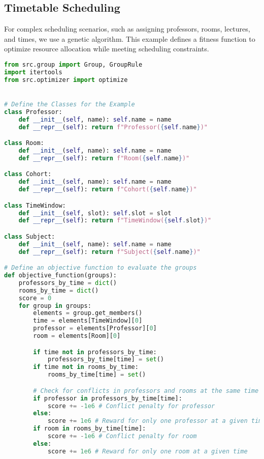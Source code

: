 \subsection{Timetable Scheduling}
For complex scheduling scenarios, such as assigning professors, rooms, lectures, and times, we use a genetic algorithm. This example defines a fitness function to optimize resource allocation while meeting scheduling constraints. 

\begin{lstlisting}[language=Python, caption={Creating and solving the Timetable Scheduling Problem using this framework.}, label={script:time_table}]
from src.group import Group, GroupRule
import itertools
from src.optimizer import optimize


# Define the Classes for the Example
class Professor:
    def __init__(self, name): self.name = name
    def __repr__(self): return f"Professor({self.name})"

class Room:
    def __init__(self, name): self.name = name
    def __repr__(self): return f"Room({self.name})"

class Cohort:
    def __init__(self, name): self.name = name
    def __repr__(self): return f"Cohort({self.name})"

class TimeWindow:
    def __init__(self, slot): self.slot = slot
    def __repr__(self): return f"TimeWindow({self.slot})"

class Subject:
    def __init__(self, name): self.name = name
    def __repr__(self): return f"Subject({self.name})"

# Define an objective function to evaluate the groups
def objective_function(groups):
    professors_by_time = dict()
    rooms_by_time = dict()
    score = 0
    for group in groups:
        elements = group.get_members()
        time = elements[TimeWindow][0]
        professor = elements[Professor][0]
        room = elements[Room][0]

        if time not in professors_by_time:
            professors_by_time[time] = set()
        if time not in rooms_by_time:
            rooms_by_time[time] = set()

        # Check for conflicts in professors and rooms at the same time
        if professor in professors_by_time[time]:
            score += -1e6 # Conflict penalty for professor
        else:
            score += 1e6 # Reward for only one professor at a given time
        if room in rooms_by_time[time]:
            score += -1e6 # Conflict penalty for room
        else:
            score += 1e6 # Reward for only one room at a given time


\end{lstlisting}
